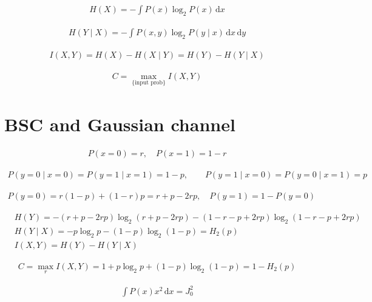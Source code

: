 \documentclass{article}
\begin{document}
\begin{align*}
H(X) = -\int P(x) \log_2 P(x) \, \mathrm{d} x 
\tag{C.11}
\end{align*}

\begin{align*}
H(Y \mid X) = -\int P(x, y) \log_2 P(y \mid x) \, \mathrm{d} x \, \mathrm{d} y 
\tag{C.12}
\end{align*}

\begin{align*}
I(X, Y) = H(X) - H(X \mid Y) = H(Y) - H(Y \mid X) 
\tag{C.13}
\end{align*}

\begin{align*}
C = \max_{\{\text{input prob}\}} I(X, Y) 
\tag{C.14}
\end{align*}

\section{BSC and Gaussian channel}

\begin{align*}
P(x = 0) = r, \quad P(x = 1) = 1 - r 
\tag{C.15}
\end{align*}

\begin{align*}
P(y=0 \mid x=0)=P(y=1 \mid x=1)=1-p, \qquad P(y=1 \mid x=0)=P(y=0 \mid x=1)=p
\tag{C.16}
\end{align*}

\begin{align*}
P(y = 0) = r(1 - p) + (1 - r)p = r + p - 2rp, \quad P(y = 1) = 1 - P(y = 0) 
\tag{C.17}
\end{align*}

\begin{align*}
& H(Y) = -(r + p - 2rp) \log_2(r + p - 2rp) -(1 - r - p + 2rp) \log_2(1 - r - p + 2rp) \\
& H(Y \mid X) = -p \log_2 p - (1 - p) \log_2(1 - p) = H_2(p) \\
& I(X, Y) = H(Y) - H(Y \mid X)
\tag{C.18}
\end{align*}

\begin{align*}
C = \max_{r} I(X, Y) = 1 + p \log_2 p + (1 - p) \log_2 (1 - p) = 1 - H_2(p) 
\tag{C.19}
\end{align*}

\begin{align*}
\int P(x) x^2 \, \mathrm{d} x = J_0^2 
\tag{C.20}
\end{align*}
\end{document}
